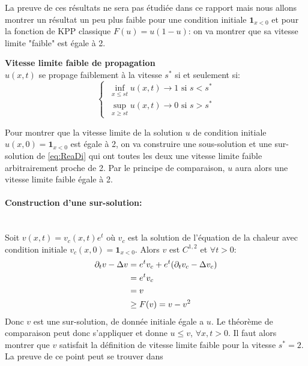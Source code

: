 \documentclass[11pt]{article}
\begin{document}
\fi

La preuve de ces résultats ne sera pas étudiée dans ce rapport mais nous allons montrer un résultat un peu plus faible pour une condition initiale  $\mathbf{1}_{x<0}$ et pour la fonction de KPP classique $F(u) = u(1-u)$: on va montrer que sa vitesse limite "faible" est égale à 2.

\begin{definition}\textbf{Vitesse limite faible de propagation}\\
$u(x,t)$ se propage faiblement à la vitesse $s^*$ si et seulement si: \[  \begin{cases} \
\inf\limits_{x\leq st}{u(x,t) \to 1 } \text{ si $s<s^*$}\\ \ \sup\limits_{x\geq st}{u(x,t) \to 0 } \text{ si $s>s^*$}
\end{cases} \]
\end{definition}
Pour montrer que la vitesse limite de la solution $u$ de condition initiale $u(x,0)=\mathbf{1}_{x<0}$ est égale à 2, on va construire une sous-solution et une sur-solution de \eqref{eq:ReaDi} qui ont toutes les deux une vitesse limite faible arbitrairement proche de 2. Par le principe de comparaison, $u$ aura alors une vitesse limite faible égale à 2.
\paragraph{Construction d'une sur-solution:} \ \\
Soit $v(x,t) = v_c(x,t)e^t$ où $v_c$ est la solution de l’équation de la chaleur avec condition initiale $v_c(x,0) =  \mathbf{1}_{x<0}$. Alors $v$ est $C^{1,2}$ et $\forall t > 0 $: \\
\begin{align*}
\partial_t v - \Delta v &= e^tv_c + e^t(\partial_t v_c - \Delta v_c) \\
&= e^tv_c \\
&= v \\
&\geq F(v) = v-v^2
\end{align*}
Donc $v$ est une sur-solution, de donnée initiale égale a $u$. Le théorème de comparaison peut donc s'appliquer et donne $u\leq v$, $\forall x, t >0$. Il faut alors montrer que $v$ satisfait la définition de vitesse limite faible pour la vitesse $s^* =2$. La preuve de ce point peut se trouver dans %
\end{document}

